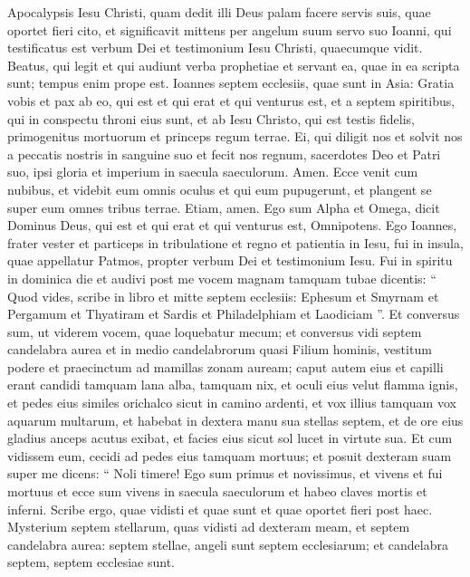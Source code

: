 \begin{biblechapter}
 \verse Apocalypsis Iesu Christi, quam dedit illi Deus palam facere servis suis, quae oportet fieri cito, et significavit mittens per angelum suum servo suo Ioanni, 
\verse qui testificatus est verbum Dei et testimonium Iesu Christi, quaecumque vidit. 
\verse Beatus, qui legit et qui audiunt verba prophetiae et servant ea, quae in ea scripta sunt; tempus enim prope est.
 \verse Ioannes septem ecclesiis, quae sunt in Asia: Gratia vobis et pax ab eo, qui est et qui erat et qui venturus est, et a septem spiritibus, qui in conspectu throni eius sunt, 
\verse et ab Iesu Christo, qui est testis fidelis, primogenitus mortuorum et princeps regum terrae.
 Ei, qui diligit nos et solvit nos a peccatis nostris in sanguine suo 
\verse et fecit nos regnum, sacerdotes Deo et Patri suo, ipsi gloria et imperium in saecula saeculorum. Amen.
 \verse Ecce venit cum nubibus, et videbit eum omnis oculus et qui eum pupugerunt, et plangent se super eum omnes tribus terrae. Etiam, amen.
 \verse Ego sum Alpha et Omega, dicit Dominus Deus, qui est et qui erat et qui venturus est, Omnipotens.
 \verse Ego Ioannes, frater vester et particeps in tribulatione et regno et patientia in Iesu, fui in insula, quae appellatur Patmos, propter verbum Dei et testimonium Iesu. 
\verse Fui in spiritu in dominica die et audivi post me vocem magnam tamquam tubae 
\verse dicentis: “ Quod vides, scribe in libro et mitte septem ecclesiis: Ephesum et Smyrnam et Pergamum et Thyatiram et Sardis et Philadelphiam et Laodiciam ”. 
\verse Et conversus sum, ut viderem vocem, quae loquebatur mecum; et conversus vidi septem candelabra aurea 
\verse et in medio candelabrorum quasi Filium hominis, vestitum podere et praecinctum ad mamillas zonam auream; 
\verse caput autem eius et capilli erant candidi tamquam lana alba, tamquam nix, et oculi eius velut flamma ignis, 
\verse et pedes eius similes orichalco sicut in camino ardenti, et vox illius tamquam vox aquarum multarum, 
\verse et habebat in dextera manu sua stellas septem, et de ore eius gladius anceps acutus exibat, et facies eius sicut sol lucet in virtute sua.
 \verse Et cum vidissem eum, cecidi ad pedes eius tamquam mortuus; et posuit dexteram suam super me dicens: “ Noli timere! Ego sum primus et novissimus, 
\verse et vivens et fui mortuus et ecce sum vivens in saecula saeculorum et habeo claves mortis et inferni. 
\verse Scribe ergo, quae vidisti et quae sunt et quae oportet fieri post haec. 
\verse Mysterium septem stellarum, quas vidisti ad dexteram meam, et septem candelabra aurea: septem stellae, angeli sunt septem ecclesiarum; et candelabra septem, septem ecclesiae sunt.
 

\end{biblechapter}
